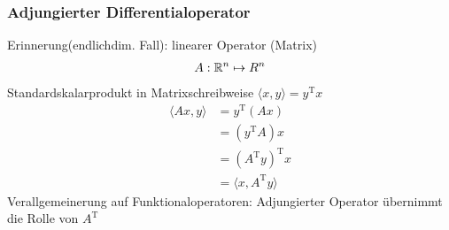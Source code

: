 \subsubsection{Adjungierter Differentialoperator}
Erinnerung(endlichdim. Fall): linearer Operator (Matrix)
\begin{align*}
A: \mathbb{R}^n \mapsto R^n
\end{align*}
Standardskalarprodukt in Matrixschreibweise $\langle x, y \rangle = y^\textrm{T} x  $
\begin{align*}
\langle Ax, y \rangle &= y^\textrm{T} (Ax) \\&= ( y^\textrm{T} A)x \\&=  ( A^\textrm{T} y)^\textrm{T}x \\& = \langle x, A^\textrm{T} y \rangle
\end{align*}
Verallgemeinerung auf Funktionaloperatoren: Adjungierter Operator übernimmt die Rolle von $A^\textrm{T}$

